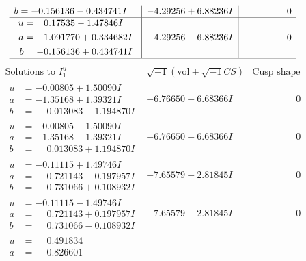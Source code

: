 \documentclass[1p]{elsarticle_modified}
\theoremstyle{definition}
\newcommand{\I}{\sqrt{-1}}
\begin{document}
$$\begin{array}{c|c|c}
\begin{aligned}
b &= -0.156136 - 0.434741 I\end{aligned}
 & -4.29256 + 6.88236 I & \phantom{-0.000000 } 0 \\ \hline\begin{aligned}
u &= \phantom{-}0.17535 - 1.47846 I \\
a &= -1.091770 + 0.334682 I \\
b &= -0.156136 + 0.434741 I\end{aligned}
 & -4.29256 - 6.88236 I & \phantom{-0.000000 } 0\\
 \hline 
 \end{array}$$\newpage$$\begin{array}{c|c|c}  
\text{Solutions to }I^u_{1}& \I (\text{vol} + \sqrt{-1}CS) & \text{Cusp shape}\\
 \hline 
\begin{aligned}
u &= -0.00805 + 1.50090 I \\
a &= -1.35168 + 1.39321 I \\
b &= \phantom{-}0.013083 - 1.194870 I\end{aligned}
 & -6.76650 - 6.68366 I & \phantom{-0.000000 } 0 \\ \hline\begin{aligned}
u &= -0.00805 - 1.50090 I \\
a &= -1.35168 - 1.39321 I \\
b &= \phantom{-}0.013083 + 1.194870 I\end{aligned}
 & -6.76650 + 6.68366 I & \phantom{-0.000000 } 0 \\ \hline\begin{aligned}
u &= -0.11115 + 1.49746 I \\
a &= \phantom{-}0.721143 - 0.197957 I \\
b &= \phantom{-}0.731066 + 0.108932 I\end{aligned}
 & -7.65579 - 2.81845 I & \phantom{-0.000000 } 0 \\ \hline\begin{aligned}
u &= -0.11115 - 1.49746 I \\
a &= \phantom{-}0.721143 + 0.197957 I \\
b &= \phantom{-}0.731066 - 0.108932 I\end{aligned}
 & -7.65579 + 2.81845 I & \phantom{-0.000000 } 0 \\ \hline\begin{aligned}
u &= \phantom{-}0.491834\phantom{ +0.000000I} \\
a &= \phantom{-}0.826601\phantom{ +0.000000I} \\

\end{aligned}
\end{array}$$
\end{document}
